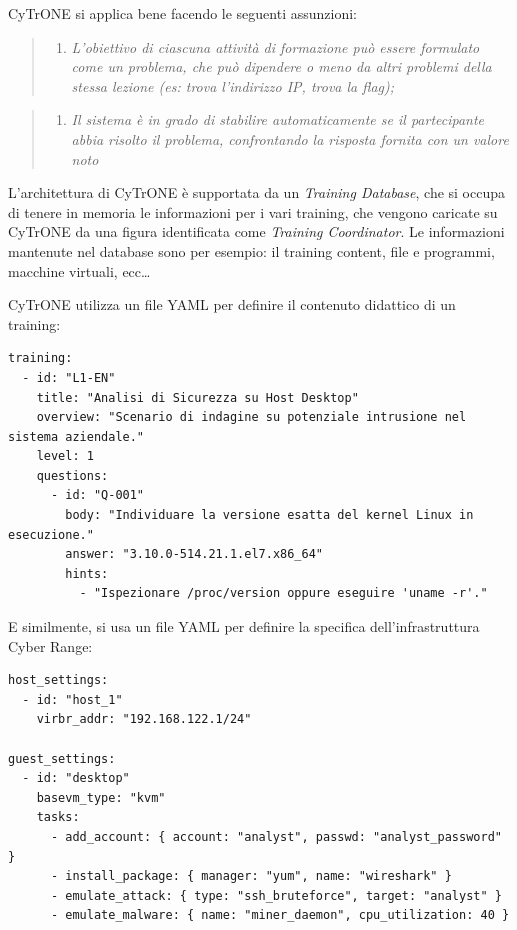 CyTrONE si applica bene facendo le seguenti assunzioni:

\begin{quote}
\begin{enumerate}
\def\labelenumi{\arabic{enumi})}
\tightlist
\item
  \emph{L'obiettivo di ciascuna attività di formazione può essere
  formulato come un problema, che può dipendere o meno da altri problemi
  della stessa lezione (es: trova l'indirizzo IP, trova la flag);}
\end{enumerate}
\end{quote}

\begin{quote}
\begin{enumerate}
\def\labelenumi{\arabic{enumi})}
\setcounter{enumi}{1}
\tightlist
\item
  \emph{Il sistema è in grado di stabilire automaticamente se il
  partecipante abbia risolto il problema, confrontando la risposta
  fornita con un valore noto} 
\end{enumerate}
\end{quote}

L'architettura di CyTrONE è supportata da un \emph{Training Database},
che si occupa di tenere in memoria le informazioni per i vari training,
che vengono caricate su CyTrONE da una figura identificata come
\emph{Training Coordinator}. Le informazioni mantenute nel database sono
per esempio: il training content, file e programmi, macchine virtuali,
ecc\ldots{} 

\pagebreak

CyTrONE utilizza un file YAML per definire il contenuto didattico di un
training:

\begin{lstlisting}
training:
  - id: "L1-EN"
    title: "Analisi di Sicurezza su Host Desktop"
    overview: "Scenario di indagine su potenziale intrusione nel sistema aziendale."
    level: 1
    questions:
      - id: "Q-001"
        body: "Individuare la versione esatta del kernel Linux in esecuzione."
        answer: "3.10.0-514.21.1.el7.x86_64"
        hints:
          - "Ispezionare /proc/version oppure eseguire 'uname -r'."
\end{lstlisting}

E similmente, si usa un file YAML per definire la specifica
dell'infrastruttura Cyber Range:

\begin{lstlisting}
host_settings:
  - id: "host_1"
    virbr_addr: "192.168.122.1/24"

guest_settings:
  - id: "desktop"
    basevm_type: "kvm"
    tasks:
      - add_account: { account: "analyst", passwd: "analyst_password" }
      - install_package: { manager: "yum", name: "wireshark" }
      - emulate_attack: { type: "ssh_bruteforce", target: "analyst" }
      - emulate_malware: { name: "miner_daemon", cpu_utilization: 40 }
\end{lstlisting}

